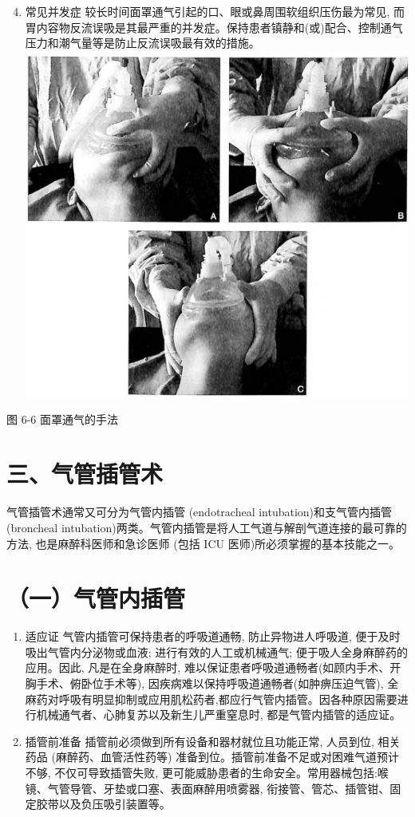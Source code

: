 \documentclass[10pt]{article}
\begin{document}
\begin{enumerate}
  \setcounter{enumi}{3}
  \item 常见并发症 较长时间面罩通气引起的口、眼或鼻周围软组织压伤最为常见, 而胃内容物反流误吸是其最严重的并发症。保持患者镇静和(或)配合、控制通气压力和潮气量等是防止反流误吸最有效的措施。\\
\includegraphics[max width=\textwidth, center]{2024_07_09_002a177993bd97d1d6d7g-088}
\end{enumerate}

图 6-6 面罩通气的手法

\section*{三、气管插管术}
气管插管术通常又可分为气管内插管 (endotracheal intubation)和支气管内插管 (broncheal intubation)两类。气管内插管是将人工气道与解剖气道连接的最可靠的方法, 也是麻醉科医师和急诊医师 (包括 ICU 医师)所必须掌握的基本技能之一。

\section*{（一）气管内插管}
\begin{enumerate}
  \item 适应证 气管内插管可保持患者的呼吸道通畅, 防止异物进人呼吸道, 便于及时吸出气管内分泌物或血液; 进行有效的人工或机械通气; 便于吸人全身麻醉药的应用。因此, 凡是在全身麻醉时, 难以保证患者呼吸道通畅者(如顾内手术、开胸手术、俯卧位手术等), 因疾病难以保持呼吸道通畅者(如肿痹压迫气管), 全麻药对呼吸有明显抑制或应用肌松药者,都应行气管内插管。因各种原因需要进行机械通气者、心肺复苏以及新生儿严重窒息时, 都是气管内插管的适应证。

  \item 插管前准备 插管前必须做到所有设备和器材就位且功能正常, 人员到位, 相关药品 (麻醉药、血管活性药等) 准备到位。插管前准备不足或对困难气道预计不够, 不仅可导致插管失败, 更可能威胁患者的生命安全。常用器械包括:喉镜、气管导管、牙垫或口塞、表面麻醉用喷雾器, 衔接管、管芯、插管钳、固定胶带以及负压吸引装置等。

\end{enumerate}
\end{document}
